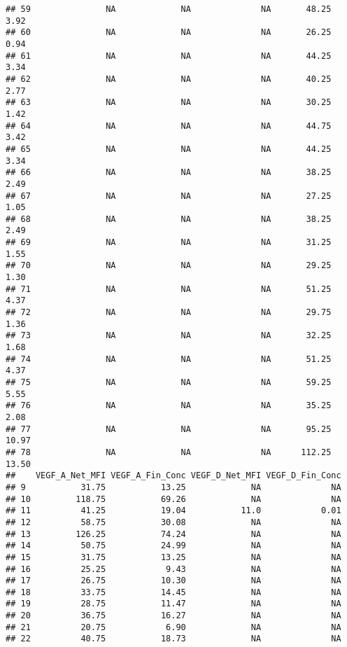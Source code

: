 \documentclass[]{article}
\begin{document}
\begin{verbatim}
## 59               NA             NA              NA       48.25         3.92
## 60               NA             NA              NA       26.25         0.94
## 61               NA             NA              NA       44.25         3.34
## 62               NA             NA              NA       40.25         2.77
## 63               NA             NA              NA       30.25         1.42
## 64               NA             NA              NA       44.75         3.42
## 65               NA             NA              NA       44.25         3.34
## 66               NA             NA              NA       38.25         2.49
## 67               NA             NA              NA       27.25         1.05
## 68               NA             NA              NA       38.25         2.49
## 69               NA             NA              NA       31.25         1.55
## 70               NA             NA              NA       29.25         1.30
## 71               NA             NA              NA       51.25         4.37
## 72               NA             NA              NA       29.75         1.36
## 73               NA             NA              NA       32.25         1.68
## 74               NA             NA              NA       51.25         4.37
## 75               NA             NA              NA       59.25         5.55
## 76               NA             NA              NA       35.25         2.08
## 77               NA             NA              NA       95.25        10.97
## 78               NA             NA              NA      112.25        13.50
##    VEGF_A_Net_MFI VEGF_A_Fin_Conc VEGF_D_Net_MFI VEGF_D_Fin_Conc
## 9           31.75           13.25             NA              NA
## 10         118.75           69.26             NA              NA
## 11          41.25           19.04           11.0            0.01
## 12          58.75           30.08             NA              NA
## 13         126.25           74.24             NA              NA
## 14          50.75           24.99             NA              NA
## 15          31.75           13.25             NA              NA
## 16          25.25            9.43             NA              NA
## 17          26.75           10.30             NA              NA
## 18          33.75           14.45             NA              NA
## 19          28.75           11.47             NA              NA
## 20          36.75           16.27             NA              NA
## 21          20.75            6.90             NA              NA
## 22          40.75           18.73             NA              NA

\end{verbatim}
\end{document}
